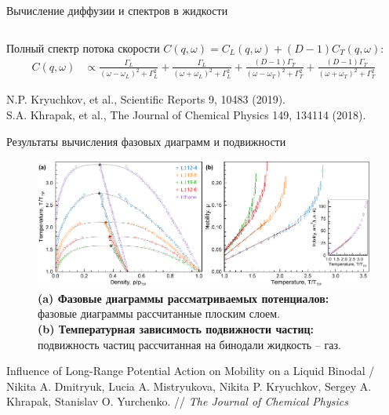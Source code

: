 \documentclass{beamer} %
\begin{document}
\begin{frame}{Вычисление диффузии и спектров в жидкости}
{\begin{columns}
\begin{column}{0.5\linewidth}
      \end{column}
    \end{columns}

    \vspace{0.5cm}

    Полный спектр потока скорости $C(q, \omega) = C_L(q, \omega) + (D-1)C_T(q, \omega)$:
    \begin{equation}
      \begin{aligned}
        C(q, \omega) & \propto \frac{\Gamma_{L}}{\left(\omega-\omega_{L}\right)^{2}+\Gamma_{L}^{2}}+\frac{\Gamma_{L}}{\left(\omega+\omega_{L}\right)^{2}+\Gamma_{L}^{2}}+\frac{(D-1) \Gamma_{T}}{\left(\omega-\omega_{T}\right)^{2}+\Gamma_{T}^{2}}+\frac{(D-1) \Gamma_{T}}{\left(\omega+\omega_{T}\right)^{2}+\Gamma_{T}^{2}}
      \end{aligned}
      \label{eq5}
    \end{equation}
  }
  \vspace{1.0cm}
  \tiny{N.P. Kryuchkov, et al., Scientific Reports 9, 10483 (2019). \\
    S.A. Khrapak, et al., The Journal of Chemical Physics 149, 134114 (2018).}

\end{frame}




\begin{frame}{Результаты вычисления фазовых диаграмм и подвижности}
  \footnotesize{
    \begin{figure}
      \centering
      \includegraphics[width=\textwidth]{MACR-Figure3}
      \caption{\footnotesize{\textbf{(a) Фазовые диаграммы рассматриваемых потенциалов:} фазовые диаграммы рассчитанные плоским слоем.\\
          \textbf{(b) Температурная зависимость подвижности частиц:} подвижность частиц рассчитанная на бинодали жидкость -- газ.}}
    \end{figure}
  }

  \tiny{Influence of Long-Range Potential Action on Mobility on a Liquid Binodal / Nikita A. Dmitryuk, Lucia A. Mistryukova, Nikita P. Kryuchkov, Sergey A. Khrapak, Stanislav O. Yurchenko. // \textit{The Journal of Chemical Physics}}
\end{frame}
\end{document}
